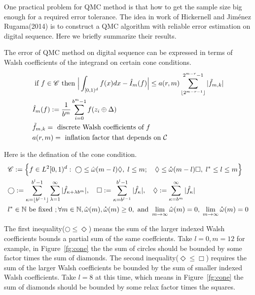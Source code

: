 

One practical problem for QMC method is that how to get the sample size big enough for a required error tolerance. The idea in work of Hickernell and Jiménez Rugama(2014)\cite{hickernell2014reliable} is to construct a QMC algorithm with reliable error estimation on digital sequence. Here we briefly summarize their results.

The error of QMC method on digital sequence can be expressed in terms of Walsh coefficients of the integrand on certain cone conditions. 
\begin{align}
    \label{eq:errBound}
    &\text{ if } f \in \mathscr{C}\text{ then } \Big|\int_{[0,1)^d}f(x)dx - \hat{I}_m(f)\Big| \leq a(r,m) \sum_{\lfloor 2^{m-r-1} \rfloor}^{2^{m-r}-1} |\tilde{f}_{m,k}|\\
    &\hat{I}_m(f): = \frac{1}{b^m}\sum_{i=0}^{b^m-1}f(z_i\oplus \Delta)\notag\\
    &\tilde{f}_{m,k}=\text{ discrete Walsh coefficients of }f \notag\\
    &a(r,m) =\text{ inflation factor that depends on } \mathcal{C} \notag
\end{align}

Here is the defination of the cone condition.
\begin{align}
   &\mathscr{C}:=\Big\{f\in L^2[0,1)^d:\;\bigcirc \leq \hat{\omega}(m-l)\Diamond,\; l\leq m;\quad
   \Diamond \leq \mathring{\omega}(m-l) \Box, 
   \; l^*\leq l \leq m\Big\}\notag\\
   \label{eq:cone}
   &\bigcirc:= \sum_{\kappa=\lfloor b^{l-1} \rfloor}^{b^l-1} \sum_{\lambda=1}^{\infty}| \hat{f}_{\kappa+\lambda b^m}|,\quad  
   \Box:= \sum_{\kappa=b^{l-1}}^{b^l-1}|\hat{f}_\kappa|,\quad
   \Diamond:=\sum_{\kappa=b^m}^{\infty}|\hat{f}_{\kappa}|\\
   &l^*\in \mathbb{N}\text{ be fixed }; \forall m\in \mathbb{N},\hat{\omega}(m),\mathring{\omega}(m)\geq 0, \text{ and } \lim_{m\to \infty} \hat{\omega}(m)=0,\; \lim_{m\to \infty} \mathring{\omega}(m)=0\notag
\end{align}

The first inequality($\bigcirc \leq \Diamond$) means the sum of the larger indexed Walsh coefficients bounds a partial sum of the same coeffcients. Take $l=0, m=12$ for example, in Figure~\ref{fg:cone} the the sum of circles should be bounded by some factor times the sum of diamonds. The second inequality($\Diamond\leq \Box$) requires the sum of the larger Walsh coefficients be bounded by the sum of smaller indexed Walsh coefficients. Take $l=8$ at this time, which means in Figure~\ref{fg:cone} the sum of diamonds should be bounded by some relax factor times the squares.

